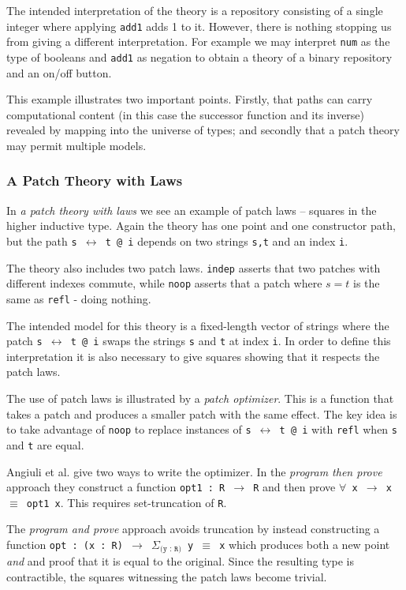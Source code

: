 The intended interpretation of the theory is a repository consisting of a single
integer where applying \texttt{add1} adds 1 to it. However, there is nothing
stopping us from giving a different interpretation. For example we may interpret
\texttt{num} as the type of booleans and \texttt{add1} as negation to obtain a
theory of a binary repository and an on/off button.

This example illustrates two important points. Firstly, that paths can carry
computational content (in this case the successor function and its inverse)
revealed by mapping into the universe of types; and secondly that a
patch theory may permit multiple models.

\subsubsection{A Patch Theory with Laws}

In \emph{a patch theory with laws} we see an example of patch laws -- squares
in the higher inductive type. Again the theory has one point and one constructor
path, but the path \texttt{s $\leftrightarrow$ t @ i} depends on two
strings \texttt{s,t} and an index \texttt{i}.

The theory also includes two patch laws. \texttt{indep} asserts that two patches
with different indexes commute, while \texttt{noop} asserts that a patch where
$s = t$ is the same as \texttt{refl} - doing nothing.

The intended model for this theory is a fixed-length vector of strings where the
patch \texttt{s $\leftrightarrow$ t @ i} swaps the strings \texttt{s} and
\texttt{t} at index \texttt{i}. In order to define this interpretation it is
also necessary to give squares showing that it respects the patch laws.

The use of patch laws is illustrated by a \emph{patch optimizer}. This is a
function that takes a patch and produces a smaller patch with the same effect.
The key idea is to take advantage of \texttt{noop} to replace instances of
\texttt{s $\leftrightarrow$ t @ i} with \texttt{refl} when \texttt{s} and
\texttt{t} are equal.

Angiuli et al. give two ways to write the optimizer. In the \emph{program then
  prove} approach they construct a function \texttt{opt1 : R $\rightarrow$ R}
and then prove \texttt{$\forall$ x $\rightarrow$ x $\equiv$ opt1 x}. This
requires set-truncation of \texttt{R}.

The \emph{program and prove} approach avoids truncation by instead
constructing a function \texttt{opt : (x : R) $\rightarrow$ $\Sigma_\texttt{(y :
    R)}$ y $\equiv$ x} which produces both a new point \emph{and} and proof that
it is equal to the original. Since the resulting type is contractible, the
squares witnessing the patch laws become trivial.

